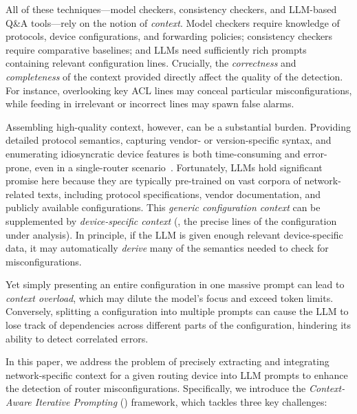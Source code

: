 
All of these techniques—model checkers, consistency checkers, and LLM-based
Q\&A tools—rely on the notion of \emph{context}. Model checkers require
knowledge of protocols, device configurations, and forwarding policies;
consistency checkers require comparative baselines; and LLMs need sufficiently
rich prompts containing relevant configuration lines. Crucially, the
\emph{correctness} and \emph{completeness} of the context provided directly
affect the quality of the detection. For instance, overlooking key ACL lines
may conceal particular misconfigurations, while feeding in irrelevant or
incorrect lines may spawn false alarms.

Assembling high-quality context, however, can be a substantial burden.
Providing detailed protocol semantics, capturing vendor- or version-specific
syntax, and enumerating idiosyncratic device features is both time-consuming
and error-prone, even in a single-router scenario~\cite{benson2009complexitymetrics, ye2020hoyan, birkner2021metha}. Fortunately, LLMs hold
significant promise here because they are typically pre-trained on vast
corpora of network-related texts, including protocol specifications, vendor
documentation, and publicly available configurations. This \emph{generic
	configuration context} can be supplemented by \emph{device-specific context}
(\ie, the precise lines of the configuration under analysis). In principle, if
the LLM is given enough relevant device-specific data, it may automatically
\emph{derive} many of the semantics needed to check for misconfigurations.

Yet simply presenting an entire configuration in one massive prompt can lead
to \emph{context overload}, which may dilute the model's focus and exceed token
limits. Conversely, splitting a configuration into multiple prompts can cause
the LLM to lose track of dependencies across different parts of the
configuration, hindering its ability to detect correlated errors.

In this paper, we address the problem of precisely extracting and integrating
network-specific context for a given routing device into LLM prompts to enhance
the detection of router misconfigurations.  Specifically, we introduce the
\emph{Context-Aware Iterative Prompting} (\sysname{}) framework, which tackles
three key challenges:

